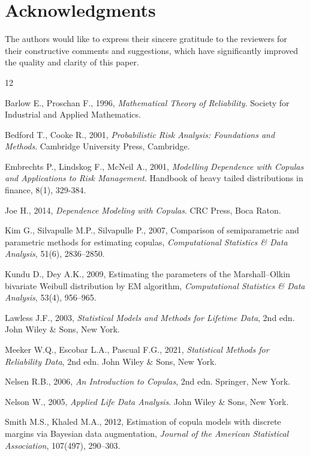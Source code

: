 \documentclass[twoside]{article}
\theoremstyle{plain}
\theoremstyle{definition}
\begin{document}
 \section*{Acknowledgments} 
The authors would like to express their sincere gratitude to the reviewers for their constructive comments and suggestions, which have significantly improved the quality and clarity of this paper.
\begin{thebibliography}{12}

Barlow E., Proschan F., 1996,
\emph{Mathematical Theory of Reliability}.
Society for Industrial and Applied Mathematics.

Bedford T., Cooke R., 2001,
\emph{Probabilistic Risk Analysis: Foundations and Methods}.
Cambridge University Press, Cambridge.

Embrechts P., Lindskog F., McNeil A., 2001,
\emph{Modelling Dependence with Copulas and Applications to Risk Management}.
 Handbook of heavy tailed distributions in finance, 8(1), 329-384.

Joe H., 2014,
\emph{Dependence Modeling with Copulas}.
CRC Press, Boca Raton.

Kim G., Silvapulle M.P., Silvapulle P., 2007,
Comparison of semiparametric and parametric methods for estimating copulas,
\emph{Computational Statistics \& Data Analysis}, 51(6), 2836--2850.

Kundu D., Dey A.K., 2009,
Estimating the parameters of the Marshall–Olkin bivariate Weibull distribution by EM algorithm,
\emph{Computational Statistics \& Data Analysis}, 53(4), 956--965.

Lawless J.F., 2003,
\emph{Statistical Models and Methods for Lifetime Data}, 2nd edn.
John Wiley \& Sons, New York.


Meeker W.Q., Escobar L.A., Pascual F.G., 2021,
\emph{Statistical Methods for Reliability Data}, 2nd edn.
John Wiley \& Sons, New York.

Nelsen R.B., 2006,
\emph{An Introduction to Copulas}, 2nd edn.
Springer, New York.

Nelson W., 2005,
\emph{Applied Life Data Analysis}.
John Wiley \& Sons, New York.

Smith M.S., Khaled M.A., 2012,
Estimation of copula models with discrete margins via Bayesian data augmentation,
\emph{Journal of the American Statistical Association}, 107(497), 290--303.


\end{thebibliography}
\clearpage
\end{document}

